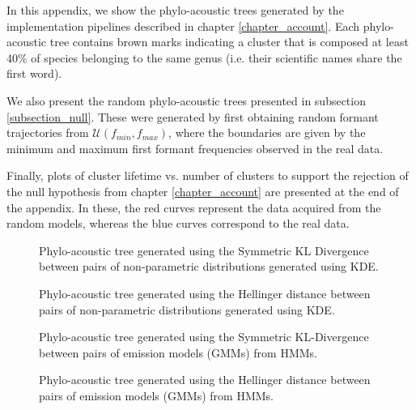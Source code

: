  \label{app_phylo}
In this appendix, we show the phylo-acoustic trees generated by the implementation pipelines described in chapter \ref{chapter_account}. Each phylo-acoustic tree contains brown marks indicating a cluster that is composed at least 40\% of species belonging to the same genus (i.e. their scientific names share the first word).
\par We also present the random phylo-acoustic trees presented in subsection \ref{subsection_null}. These were generated by first obtaining random formant trajectories from $\mathcal{U}(f_{min}, f_{max})$, where the boundaries are given by the minimum and maximum first formant frequencies observed in the real data.
\par Finally, plots of cluster lifetime vs. number of clusters to support the rejection of the null hypothesis from chapter \ref{chapter_account} are presented at the end of the appendix. In these, the red curves represent the data acquired from the random models, whereas the blue curves correspond to the real data.

\begin{sidewaysfigure}[ht]
\noindent{}
    \caption{Phylo-acoustic tree generated using the Symmetric KL Divergence between pairs of non-parametric distributions generated using KDE.}
    \label{fig:kdeskld}
\end{sidewaysfigure}


\begin{sidewaysfigure}[ht]
\noindent{}
    \caption{Phylo-acoustic tree generated using the Hellinger distance between pairs of non-parametric distributions generated using KDE.}
    \label{fig:kdehellinger}
\end{sidewaysfigure}


\begin{sidewaysfigure}[ht]
\noindent{}
    \caption{Phylo-acoustic tree generated using the Symmetric KL-Divergence between pairs of emission models (GMMs) from HMMs.}
    \label{fig:gmmskld}
\end{sidewaysfigure}


\begin{sidewaysfigure}[ht]
\noindent{}
    \caption{Phylo-acoustic tree generated using the Hellinger distance between pairs of emission models (GMMs) from HMMs.}
    \label{fig:gmmhellinger}
\end{sidewaysfigure}


